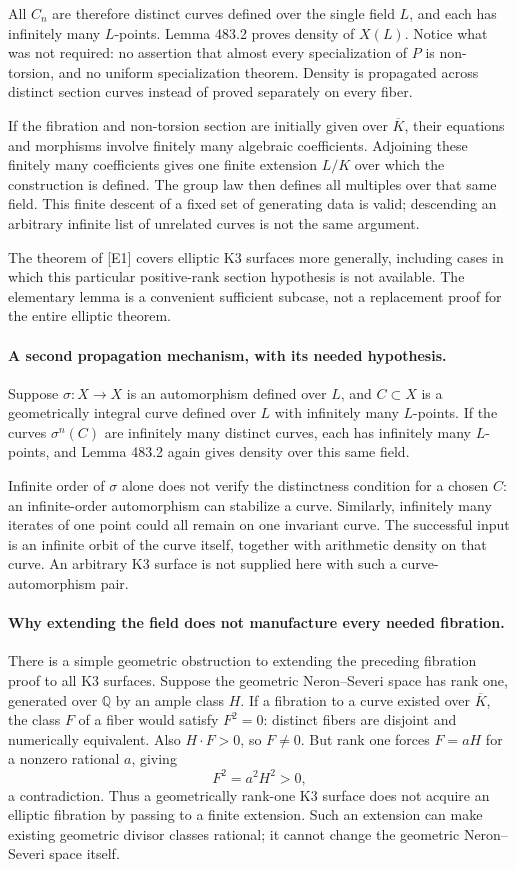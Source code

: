 \documentclass[11pt]{article}
\begin{document}
All $C_n$ are therefore distinct curves defined over the single field
$L$, and each has infinitely many $L$-points. Lemma 483.2 proves density
of $X(L)$. Notice what was not required: no assertion that almost every
specialization of $P$ is non-torsion, and no uniform specialization theorem.
Density is propagated across distinct section curves instead of proved
separately on every fiber.

If the fibration and non-torsion section are initially given over
$\overline K$, their equations and morphisms involve finitely many
algebraic coefficients. Adjoining these finitely many coefficients gives
one finite extension $L/K$ over which the construction is defined. The
group law then defines all multiples over that same field. This finite
descent of a fixed set of generating data is valid; descending an arbitrary
infinite list of unrelated curves is not the same argument.

The theorem of [E1] covers elliptic K3 surfaces more generally, including
cases in which this particular positive-rank section hypothesis is not
available. The elementary lemma is a convenient sufficient subcase, not
a replacement proof for the entire elliptic theorem.

\paragraph{A second propagation mechanism, with its needed hypothesis.}
Suppose $\sigma:X\to X$ is an automorphism defined over $L$, and
$C\subset X$ is a geometrically integral curve defined over $L$ with
infinitely many $L$-points. If the curves $\sigma^n(C)$ are infinitely
many distinct curves, each has infinitely many $L$-points, and Lemma 483.2
again gives density over this same field.

Infinite order of $\sigma$ alone does not verify the distinctness condition
for a chosen $C$: an infinite-order automorphism can stabilize a curve.
Similarly, infinitely many iterates of one point could all remain on one
invariant curve. The successful input is an infinite orbit of the curve
itself, together with arithmetic density on that curve. An arbitrary K3
surface is not supplied here with such a curve-automorphism pair.

\paragraph{Why extending the field does not manufacture every needed fibration.}
There is a simple geometric obstruction to extending the preceding
fibration proof to all K3 surfaces. Suppose the geometric Neron--Severi
space has rank one, generated over $\mathbb Q$ by an ample class $H$.
If a fibration to a curve existed over $\overline K$, the class $F$ of a
fiber would satisfy $F^2=0$: distinct fibers are disjoint and numerically
equivalent. Also $H\cdot F>0$, so $F\ne0$. But rank one forces
$F=aH$ for a nonzero rational $a$, giving
\[
 F^2=a^2H^2>0,
\]
a contradiction. Thus a geometrically rank-one K3 surface does not acquire
an elliptic fibration by passing to a finite extension. Such an extension
can make existing geometric divisor classes rational; it cannot change
the geometric Neron--Severi space itself.
\end{document}
